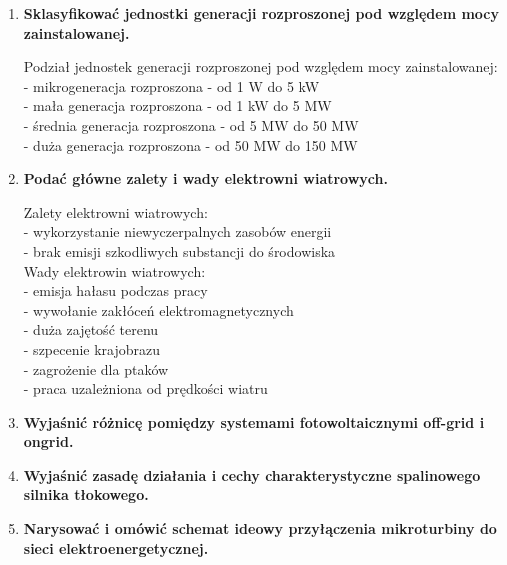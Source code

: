 \documentclass[12pt]{article}
\begin{document}
\begin{enumerate}
    \item \textbf{Sklasyfikować jednostki generacji rozproszonej pod względem mocy zainstalowanej.}

        Podział jednostek generacji rozproszonej pod względem mocy zainstalowanej:\\
        - mikrogeneracja rozproszona - od 1 W do 5 kW\\
        - mała generacja rozproszona - od 1 kW do 5 MW\\
        - średnia generacja rozproszona - od 5 MW do 50 MW\\
        - duża generacja rozproszona - od 50 MW do 150 MW
        
    \item \textbf{Podać główne zalety i wady elektrowni wiatrowych.}
    
        Zalety elektrowni wiatrowych:\\
        - wykorzystanie niewyczerpalnych zasobów energii\\
        - brak emisji szkodliwych substancji do środowiska\\
        Wady elektrowin wiatrowych:\\
        - emisja hałasu podczas pracy\\
        - wywołanie zakłóceń elektromagnetycznych\\
        - duża zajętość terenu\\
        - szpecenie krajobrazu\\
        - zagrożenie dla ptaków\\
        - praca uzależniona od prędkości wiatru
        
    \item \textbf{Wyjaśnić różnicę pomiędzy systemami fotowoltaicznymi off-grid i ongrid.}
    \item \textbf{Wyjaśnić zasadę działania i cechy charakterystyczne spalinowego silnika tłokowego.}
    \item \textbf{Narysować i omówić schemat ideowy przyłączenia mikroturbiny do sieci elektroenergetycznej.}
\end{enumerate}
\end{document}
